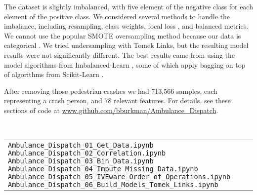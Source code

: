 The dataset is slightly imbalanced, with five element of the negative class for each element of the positive class.  We considered several methods to handle the imbalance, including resampling, class weights, focal loss \citep{lin2017focal}, and balanced metrics.  We cannot use the popular SMOTE oversampling method because our data is categorical \citep{Chawla_2002}.  We tried undersampling with Tomek Links, but the resulting model results were not significantly different.  The best results came from using the model algorithms from Imbalanced-Learn \citep{Imblearn}, some of which apply bagging on top of algorithms from Scikit-Learn \citep{scikit-learn}.

After removing those pedestrian crashes we had 713,566 samples, each representing a crash person, and 78 relevant features.  For details, see these sections of code at 
\url{www.github.com/bburkman/Ambulance_Dispatch}.

\

\begin{tabular}{l}
	\verb|Ambulance_Dispatch_01_Get_Data.ipynb| \cr
	\verb|Ambulance_Dispatch_02_Correlation.ipynb| \cr
	\verb|Ambulance_Dispatch_03_Bin_Data.ipynb| \cr
	\verb|Ambulance_Dispatch_04_Impute_Missing_Data.ipynb| \cr
	\verb|Ambulance_Dispatch_05_IVEware_Order_of_Operations.ipynb| \cr
	\verb|Ambulance_Dispatch_06_Build_Models_Tomek_Links.ipynb| \cr
\end{tabular}


